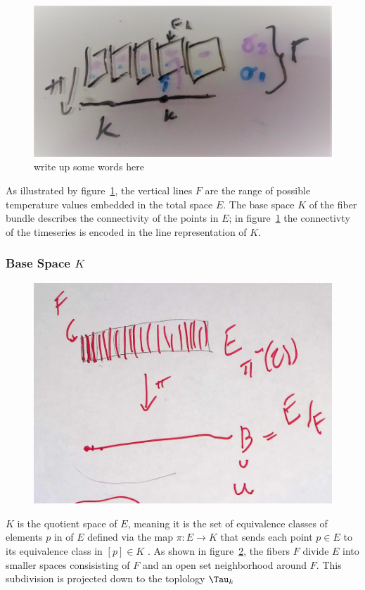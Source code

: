 \documentclass[../main.tex]{subfiles}
\begin{document}
\begin{figure}[ht]
    \label{fig:fiberbundle}
    \includegraphics[width=.2\linewidth]{figures/sections/math/fiberbundle.png}
    \caption{write up some words here}
\end{figure}

As illustrated by figure~\ref{fig:fiberbundle}, the vertical lines $F$ are the range of possible temperature values embedded in the total space $E$. The base space $K$ of the fiber bundle describes the connectivity of the points in $E$; in figure~\ref{fig:fiberbundle} the connectivty of the timeseries is encoded in the line representation of $K$. 

\subsubsection{Base Space $K$}

\begin{figure}
    \includegraphics{figures/sections/math/k_qspace.png}
    \label{fig:kquotient}
\end{figure}

$K$ is the quotient space of $E$, meaning it is the set of equivalence classes of elements $p$ in of $E$ defined via the map $\pi: E \rightarrow K$ that sends each point $p \in E$ to its equivalence class in $[p] \in K$ \cite{QuotientSpaceTopology2020,QuotientSpaceTopology2020}. As shown in figure~\ref{fig:kquotient}, the fibers $F$ divide $E$ into smaller spaces consisisting of $F$ and an open set neighborhood around $F$. This subdivision is projected down to the toplology $\Tau_k$
\end{document}
